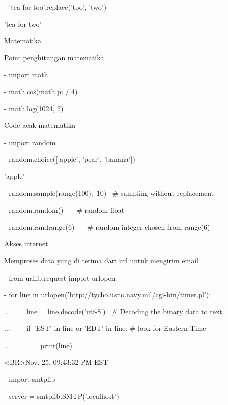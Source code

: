 \noindent 
- 'tea for too'.replace('too', 'two') \par
\noindent 
'tea for two' \par
\vspace{12pt}
\noindent 
Matematika  \par
\noindent 
Point penghitungan matematika \par
\noindent 
- import math \par
\noindent 
- math.cos(math.pi / 4) \par
{} \par
\noindent 
- math.log(1024, 2) \par
{} \par
\noindent 
Code acak matematika \par
\noindent 
- import random \par
\noindent 
- random.choice(['apple', 'pear', 'banana']) \par
\noindent 
'apple' \par
\noindent 
- random.sample(range(100),~10)~   $  \#  $ sampling without replacement \par
\noindent 
[30, 83, 16, 4, 8, 81, 41, 50, 18, 33] \par
\noindent 
- random.random()~~~  $  \#  $ random float \par
{} \par
\noindent 
- random.randrange(6)~~~  $  \#  $ random integer chosen from range(6) \par
{} \par
\noindent 
Akses internet \par
\noindent 
Memproses data yang di terima dari url untuk mengirim email \par
\noindent 
- from urllib.request import urlopen \par
\noindent 
- for line in urlopen('http://tycho.usno.navy.mil/cgi-bin/timer.pl'): \par
\noindent 
...~~~~ line = line.decode('utf-8')~  $  \#  $ Decoding the binary data to text. \par
\noindent 
...~~~~ if~'EST' in line or 'EDT' in line:   $  \#  $ look for Eastern Time \par
\noindent 
...~~~~~~~~ print(line) \par
\noindent 
<BR>Nov. 25, 09:43:32 PM EST \par
\noindent 
- import smtplib \par
\noindent 
- server = smtplib.SMTP('localhost') \par

